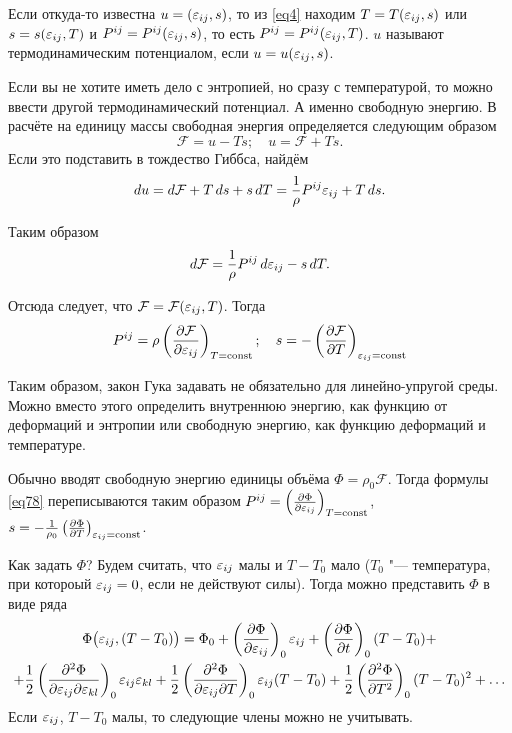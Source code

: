Если откуда-то известна $u = (\varepsilon_{ij},s)$, то из \eqref{eq4}  находим $T = T(\varepsilon_{ij},s)$ или $s= s(\varepsilon_{ij},T)$ и $P^{ij} = P^{ij}(\varepsilon_{ij},s)$, то есть $P^{ij} = P^{ij}(\varepsilon_{ij},T)$.
$u$ называют термодинамическим потенциалом, если $u = u(\varepsilon_{ij},s)$.

Если вы не хотите иметь дело с энтропией, но сразу с температурой, то можно ввести другой термодинамический потенциал. А именно свободную энергию. В расчёте на единицу массы свободная энергия определяется следующим образом
\[
\mathcal F = u - Ts;\quad u = \mathcal F + Ts.
\]
Если это  подставить в тождество Гиббса, найдём
\[
  du = d\mathcal F + T\,ds + s\,dT = \frac1\rho P^{ij}\varepsilon_{ij} + T\,ds.
\]

Таким образом
\begin{equation}
d\mathcal F = \frac1\rho P^{ij}\,d\varepsilon_{ij} - s\,dT.
\label{eq6}
\end{equation}

Отсюда следует, что $\mathcal F = \mathcal F (\varepsilon_{ij},T)$. Тогда
\begin{equation}
P^{ij} = \rho\left( \frac{\partial \mathcal F}{\partial \varepsilon_{ij}} \right)_{T=\operatorname{const}};\quad
s = -\left( \frac{\partial \mathcal F}{\partial T} \right)_{\varepsilon_{ij}=\operatorname{const}}
\label{eq78}
\end{equation}

Таким образом, закон Гука задавать не обязательно для линейно-упругой среды. Можно вместо этого определить внутреннюю энергию, как функцию от деформаций и энтропии или свободную энергию, как функцию деформаций и температуре.

Обычно вводят свободную энергию единицы объёма $\Phi = \rho_0\mathcal F$. Тогда формулы \eqref{eq78} переписываются таким образом
$P^{ij} = \left(\frac{\partial \Phi}{\partial \varepsilon_{ij}}\right)_{T=\operatorname{const}}$,
$s = -\frac1{\rho_0}\left( \frac{\partial \Phi}{\partial T} \right)_{\varepsilon_{ij}=\operatorname{const}}$.

Как задать $\Phi$? Будем считать, что $\varepsilon_{ij}$ малы и $T-T_0$ мало ($T_0$ "--- температура, при котороый $\varepsilon_{ij}=0$, если не действуют силы). Тогда можно представить $\Phi$ в виде ряда
\begin{multline*}
\Phi\big(\varepsilon_{ij},(T-T_0)\big) = \Phi_0 + \left( \frac{\partial \Phi}{\partial \varepsilon_{ij}} \right)_0\varepsilon_{ij} + \left( \frac{\partial \Phi}{\partial t} \right)_0(T-T_0) +\\+
\frac12 \left( \frac{\partial ^2\Phi}{\partial \varepsilon_{ij}\partial\varepsilon_{kl}} \right)_0\varepsilon_{ij}\varepsilon_{kl} + \frac12\left( \frac{\partial ^2\Phi}{\partial \varepsilon_{ij}\partial T} \right)_0\varepsilon_{ij}(T-T_0) + 
\frac12 \left( \frac{\partial ^2\Phi}{\partial T^2} \right)_0(T-T_0)^2 + \dots
\end{multline*}
Если $\varepsilon_{ij}$, $T-T_0$ малы, то следующие члены можно не учитывать.

